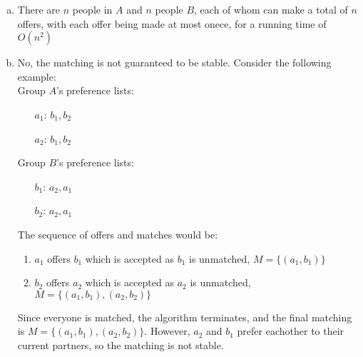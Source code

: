 \documentclass{article}
\begin{document}
\begin{enumerate}[a)]
    \item There are $n$ people in $A$ and $n$ people $B$, each of whom can make a total of $n$ offers, with each offer being made at most onece, for a running time of $O(n^2)$
    \item No, the matching is not guaranteed to be stable. Consider the following example: \\[0.75ex]
    Group $A$'s preference lists: 
    \begin{enumerate}
        \item[$a_1$:] $b_1, b_2$
        \item[$a_2$:] $b_1, b_2$
    \end{enumerate} 
    Group $B$'s preference lists: 
    \begin{enumerate}
        \item[$b_1$:] $a_2, a_1$
        \item[$b_2$:] $a_2, a_1$
    \end{enumerate} 
    The sequence of offers and matches would be: 
    \begin{enumerate}[1.]
        \item $a_1$ offers $b_1$ which is accepted as $b_1$ is unmatched, $M = \{(a_1, b_1)\}$
        \item $b_2$ offers $a_2$ which is accepted as $a_2$ is unmatched, $M = \{(a_1, b_1), (a_2, b_2)\}$
    \end{enumerate}
    Since everyone is matched, the algorithm terminates, and the final matching is $M = \{(a_1, b_1), (a_2, b_2)\}$. However, $a_2$ and $b_1$ prefer eachother to their current partners, so the matching is not stable. 

\end{enumerate}
\end{document}
